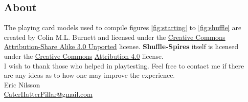 
\subsection{About}
\label{sec:about}
The playing card models used to compile figures \ref{fig:starting} to \ref{fig:shuffle} are created by Colin M.L. Burnett and licensed under the \href{http://en.wikipedia.org/wiki/en:Creative_Commons}{Creative Commons} \href{http://creativecommons.org/licenses/by-sa/3.0/deed.en}{Attribution-Share Alike 3.0 Unported} license.
\textbf{Shuffle-Spires} itself is licensed under the \href{http://en.wikipedia.org/wiki/en:Creative_Commons}{Creative Commons} \href{http://creativecommons.org/licenses/by/4.0/}{Attribution 4.0} license.\\

\noindent
I wish to thank those who helped in playtesting.
Feel free to contact me if there are any ideas as to how one may improve the experience.\\

\noindent
Eric Nilsson \\
\href{mailto:CaterHatterPillar@gmail.com}{CaterHatterPillar@gmail.com}

